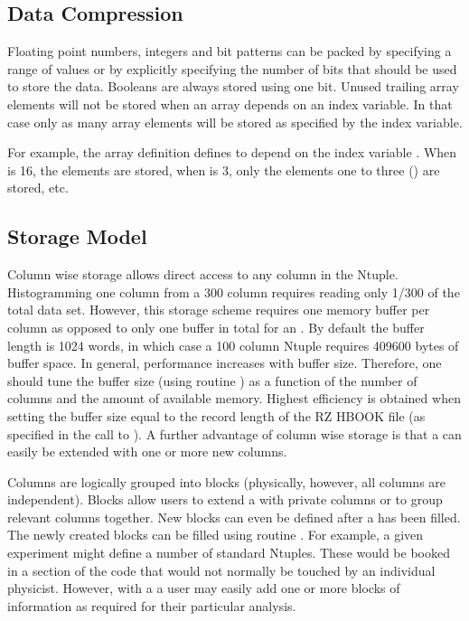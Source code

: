 \subsection*{Data Compression}

Floating point numbers, integers and bit patterns can be packed by
specifying a range of values or by explicitly specifying the number
of bits that should be used to store the data. Booleans are always
stored using one bit. Unused trailing array elements will not be
stored when an array depends on an index variable. In that case only
as many array elements will be stored as specified by the index
variable.

For example, the array definition 
defines  to depend on the index variable .
When  is 16, the elements  are stored,
when  is 3, only the elements one to three
() are stored, etc.

\subsection*{Storage Model}

Column wise storage allows direct access to any column in the Ntuple.
Histogramming one column from a 300 column \CWN{} requires reading
only 1/300 of the total data set.
However, this storage scheme requires one memory buffer per column
as opposed to only one buffer in total for an \RWN.
By default the buffer length is 1024 words,
in which case a 100 column Ntuple requires 409600 bytes of buffer space.
In general, performance increases with buffer size.
Therefore, one should tune the buffer size (using routine )
as a function of the number of columns and the amount of available memory.
Highest efficiency is obtained when setting the buffer size equal to the
record length of the RZ HBOOK file (as specified in the call to
).
A further advantage of column wise storage is that a \CWN{}
can easily be extended with one or more new columns.

Columns are logically grouped into blocks (physically, however, all
columns are independent).
Blocks allow users to extend a \CWN{} with private columns or to
group relevant columns together.
New blocks can even be defined after a \CWN{} has been filled.
The newly created blocks can be filled using routine .
For example, a given experiment might define a number of standard
Ntuples. These would be booked in a section of the code that
would not normally be touched by an individual physicist. However,
with a \CWN{} a user may easily add one or more blocks of information
as required for their particular analysis.

